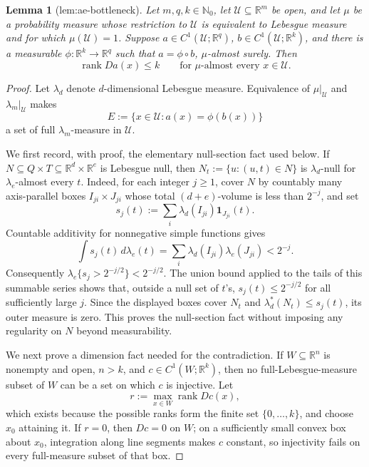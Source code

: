 \documentclass{article}
\newtheorem{lemma}{Lemma}
\begin{document}
\begin{lemma}[lem:ae-bottleneck]\label{lem:ae-bottleneck}
Let \(m,q,k\in\mathbb N_0\), let \(\mathcal U\subseteq\mathbb R^m\) be open, and let \(\mu\) be a probability measure whose restriction to \(\mathcal U\) is equivalent to Lebesgue measure and for which \(\mu(\mathcal U)=1\).  Suppose \(a\in C^1(\mathcal U;\mathbb R^q)\), \(b\in C^1(\mathcal U;\mathbb R^k)\), and there is a measurable \(\phi:\mathbb R^k\to\mathbb R^q\) such that \(a=\phi\circ b\), \(\mu\)-almost surely.  Then
\[
 \operatorname{rank}Da(x)\leq k
 \qquad\text{for }\mu\text{-almost every }x\in\mathcal U.
\]
\end{lemma}
\begin{proof}
Let \(\lambda_d\) denote \(d\)-dimensional Lebesgue measure.  Equivalence of \(\mu|_{\mathcal U}\) and \(\lambda_m|_{\mathcal U}\) makes
\[
 E:=\{x\in\mathcal U:a(x)=\phi(b(x))\}
\]
a set of full \(\lambda_m\)-measure in \(\mathcal U\).

We first record, with proof, the elementary null-section fact used below.  If \(N\subseteq Q\times T\subseteq\mathbb R^d\times\mathbb R^e\) is Lebesgue null, then \(N_t:=\{u:(u,t)\in N\}\) is \(\lambda_d\)-null for \(\lambda_e\)-almost every \(t\).  Indeed, for each integer \(j\geq1\), cover \(N\) by countably many axis-parallel boxes \(I_{ji}\times J_{ji}\) whose total \((d+e)\)-volume is less than \(2^{-j}\), and set
\[
 s_j(t):=\sum_i\lambda_d(I_{ji})\mathbf 1_{J_{ji}}(t).
\]
Countable additivity for nonnegative simple functions gives
\[
 \int s_j(t)\,d\lambda_e(t)
 =\sum_i\lambda_d(I_{ji})\lambda_e(J_{ji})<2^{-j}. \tag{1}
\]
Consequently \(\lambda_e\{s_j>2^{-j/2}\}<2^{-j/2}\).  The union bound applied to the tails of this summable series shows that, outside a null set of \(t\)'s, \(s_j(t)\leq2^{-j/2}\) for all sufficiently large \(j\).  Since the displayed boxes cover \(N_t\) and \(\lambda_d^*(N_t)\leq s_j(t)\), its outer measure is zero.  This proves the null-section fact without imposing any regularity on \(N\) beyond measurability.

We next prove a dimension fact needed for the contradiction.  If \(W\subseteq\mathbb R^n\) is nonempty and open, \(n>k\), and \(c\in C^1(W;\mathbb R^k)\), then no full-Lebesgue-measure subset of \(W\) can be a set on which \(c\) is injective.  Let
\[
 r:=\max_{x\in W}\operatorname{rank}Dc(x),
\]
which exists because the possible ranks form the finite set \(\{0,\ldots,k\}\), and choose \(x_0\) attaining it.  If \(r=0\), then \(Dc=0\) on \(W\); on a sufficiently small convex box about \(x_0\), integration along line segments makes \(c\) constant, so injectivity fails on every full-measure subset of that box.


\end{proof}
\end{document}
